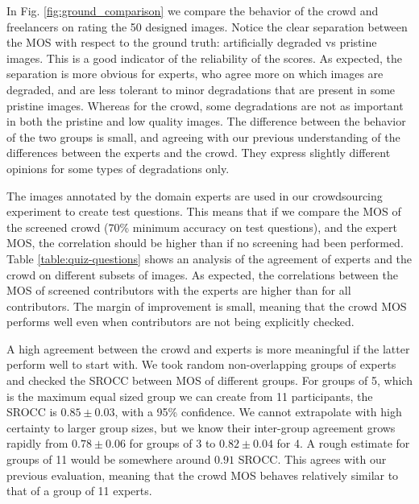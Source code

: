 \documentclass{article}
\begin{document}
In Fig. \ref{fig:ground_comparison} we compare the behavior of the crowd and freelancers on rating the 50 designed images. Notice the clear separation between the MOS with respect to the ground truth: artificially degraded vs pristine images. This is a good indicator of the reliability of the scores. As expected, the separation is more obvious for experts, who agree more on which images are degraded, and are less tolerant to minor degradations that are present in some pristine images. Whereas for the crowd, some degradations are not as important in both the pristine and low quality images. The difference between the behavior of the two groups is small, and agreeing with our previous understanding of the differences between the experts and the crowd. They express slightly different opinions for some types of degradations only.



The images annotated by the domain experts are used in our crowdsourcing experiment to create test questions. This means that if we compare the MOS of the screened crowd (70\% minimum accuracy on test questions), and the expert MOS, the correlation should be higher than if no screening had been performed. Table \ref{table:quiz-questions} shows an analysis of the agreement of experts and the crowd on different subsets of images.
As expected, the correlations between the MOS of screened contributors with the experts are higher than for all contributors. The margin of improvement is small, meaning that the crowd MOS performs well even when contributors are not being explicitly checked.

A high agreement between the crowd and experts is more meaningful if the latter perform well to start with. We took random non-overlapping groups of experts and checked the SROCC between MOS of different groups. For groups of 5, which is the maximum equal sized group we can create from 11 participants, the SROCC is $0.85\pm0.03$, with a 95\% confidence. We cannot extrapolate with high certainty to larger group sizes, but we know their inter-group agreement grows rapidly from $0.78\pm0.06$ for groups of 3 to $0.82\pm0.04$ for 4. A rough estimate for groups of 11 would be somewhere around $0.91$ SROCC. This agrees with our previous evaluation, meaning that the crowd MOS behaves relatively similar to that of a group of 11 experts.
\end{document}
